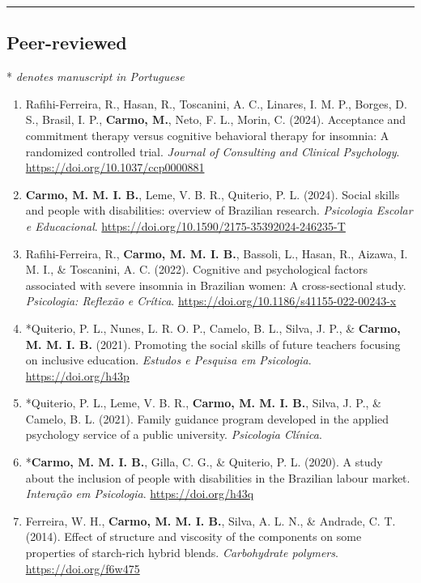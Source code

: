\documentclass[10pt,]{article}
\begin{document}
\hrule

\subsection{\texorpdfstring{\textbf{Peer-reviewed}}{Peer-reviewed}}\label{peer-reviewed}

* \emph{denotes manuscript in Portuguese}

\begin{enumerate}
\def\labelenumi{\arabic{enumi}.}
\item
  Rafihi-Ferreira, R., Hasan, R., Toscanini, A. C., Linares, I. M. P.,
  Borges, D. S., Brasil, I. P., \textbf{Carmo, M.}, Neto, F. L., Morin,
  C. (2024). Acceptance and commitment therapy versus cognitive
  behavioral therapy for insomnia: A randomized controlled trial.
  \emph{Journal of Consulting and Clinical Psychology}.
  \url{https://doi.org/10.1037/ccp0000881}
\item
  \textbf{Carmo, M. M. I. B.}, Leme, V. B. R., Quiterio, P. L. (2024).
  Social skills and people with disabilities: overview of Brazilian
  research. \emph{Psicologia Escolar e Educacional}.
  \url{https://doi.org/10.1590/2175-35392024-246235-T}
\item
  Rafihi-Ferreira, R., \textbf{Carmo, M. M. I. B.}, Bassoli, L., Hasan,
  R., Aizawa, I. M. I., \& Toscanini, A. C. (2022). Cognitive and
  psychological factors associated with severe insomnia in Brazilian
  women: A cross-sectional study. \emph{Psicologia: Reflexão e Crítica}.
  \url{https://doi.org/10.1186/s41155-022-00243-x}
\item
  *Quiterio, P. L., Nunes, L. R. O. P., Camelo, B. L., Silva, J. P., \&
  \textbf{Carmo, M. M. I. B.} (2021). Promoting the social skills of
  future teachers focusing on inclusive education. \emph{Estudos e
  Pesquisa em Psicologia}. \url{https://doi.org/h43p}
\item
  *Quiterio, P. L., Leme, V. B. R., \textbf{Carmo, M. M. I. B.}, Silva,
  J. P., \& Camelo, B. L. (2021). Family guidance program developed in
  the applied psychology service of a public university.
  \emph{Psicologia Clínica}.
\item
  *\textbf{Carmo, M. M. I. B.}, Gilla, C. G., \& Quiterio, P. L. (2020).
  A study about the inclusion of people with disabilities in the
  Brazilian labour market. \emph{Interação em Psicologia}.
  \url{https://doi.org/h43q}
\item
  Ferreira, W. H., \textbf{Carmo, M. M. I. B.}, Silva, A. L. N., \&
  Andrade, C. T. (2014). Effect of structure and viscosity of the
  components on some properties of starch-rich hybrid blends.
  \emph{Carbohydrate polymers}. \url{https://doi.org/f6w475}
\end{enumerate}
\end{document}
